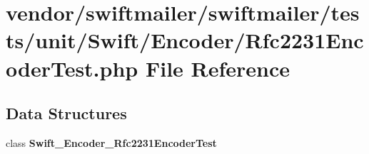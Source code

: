 \section{vendor/swiftmailer/swiftmailer/tests/unit/\+Swift/\+Encoder/\+Rfc2231\+Encoder\+Test.php File Reference}
\label{_rfc2231_encoder_test_8php}
\subsection*{Data Structures}
\begin{DoxyCompactItemize}
\item 
class {\bf Swift\+\_\+\+Encoder\+\_\+\+Rfc2231\+Encoder\+Test}
\end{DoxyCompactItemize}

